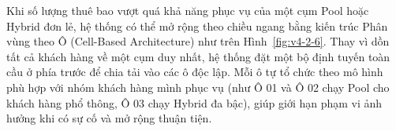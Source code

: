 
\begin{landscape}
\renewcommand{\VfourImageMaxHeight}{.52\textheight}
Khi số lượng thuê bao vượt quá khả năng phục vụ của một cụm Pool hoặc Hybrid đơn lẻ, hệ thống có thể mở rộng theo chiều ngang bằng kiến trúc Phân vùng theo Ô (Cell-Based Architecture) như trên Hình~\ref{fig:v4-2-6}. Thay vì dồn tất cả khách hàng về một cụm duy nhất, hệ thống đặt một bộ định tuyến toàn cầu ở phía trước để chia tải vào các ô độc lập. Mỗi ô tự tổ chức theo mô hình phù hợp với nhóm khách hàng mình phục vụ (như Ô 01 và Ô 02 chạy Pool cho khách hàng phổ thông, Ô 03 chạy Hybrid đa bậc), giúp giới hạn phạm vi ảnh hưởng khi có sự cố và mở rộng thuận tiện.


\end{landscape}
